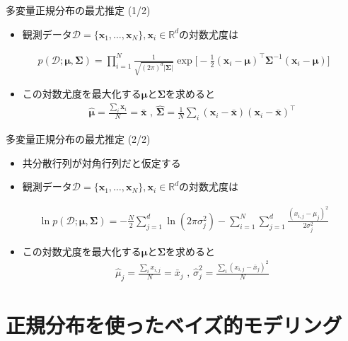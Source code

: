\documentclass[aspectratio=169,unicode,dvipdfmx,14pt]{beamer}
\begin{document}
\begin{frame}{多変量正規分布の最尤推定 (1/2)}
\begin{itemize}
\item 観測データ$\mathcal{D}=\{ \bm{x}_1, \ldots, \bm{x}_N \}, \bm{x}_i \in \mathbb{R}^d$の対数尤度は
\end{itemize}
\begin{align}
p(\mathcal{D};\bm{\mu},\bm{\Sigma})
=
\prod_{i=1}^N \frac{1}{\sqrt{(2\pi)^d|\bm{\Sigma}|}}
\exp\bigg[ - \frac{1}{2} (\bm{x}_i - \bm{\mu})^\intercal \bm{\Sigma}^{-1} (\bm{x}_i - \bm{\mu}) \bigg]
\end{align}
\begin{itemize}
\item この対数尤度を最大化する$\bm{\mu}$と$\bm{\Sigma}$を求めると
\begin{align}
\hat{\bm{\mu}} = \frac{\sum_i \bm{x}_i}{N} = \bar{\bm{x}} \mbox{ , \ }
\hat{\bm{\Sigma}} = \frac{1}{N}\sum_i (\bm{x}_i - \bar{\bm{x}}) (\bm{x}_i - \bar{\bm{x}})^\intercal
\end{align}
\end{itemize}
\end{frame}


\begin{frame}{多変量正規分布の最尤推定 (2/2)}
\begin{itemize}
\item 共分散行列が対角行列だと仮定する
\item 観測データ$\mathcal{D}=\{ \bm{x}_1, \ldots, \bm{x}_N \}, \bm{x}_i \in \mathbb{R}^d$の対数尤度は
\end{itemize}
\begin{align}
\ln p(\mathcal{D};\bm{\mu},\bm{\Sigma})
= -\frac{N}{2}\sum_{j=1}^d \ln(2\pi\sigma_j^2) - \sum_{i=1}^N \sum_{j=1}^d \frac{(x_{i,j} - \mu_j)^2}{2\sigma_j^2}
\end{align}
\begin{itemize}
\item この対数尤度を最大化する$\bm{\mu}$と$\bm{\Sigma}$を求めると
\begin{align}
\hat{\mu}_j = \frac{\sum_i x_{i,j}}{N} = \bar{x}_j \mbox{ , \ }
\hat{\sigma}_j^2 = \frac{\sum_i (x_{i,j} - \bar{x}_j)^2}{N}
\end{align}
\end{itemize}
\end{frame}


\section{正規分布を使ったベイズ的モデリング}
\end{document}
